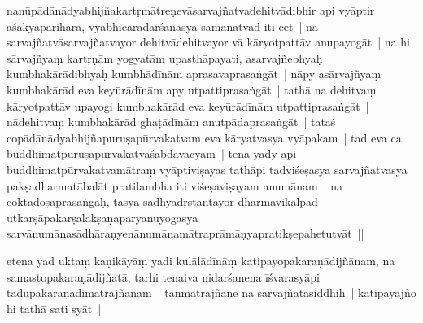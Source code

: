 \documentclass[article,12pt,a4paper]{memoir}
\begin{document}
	  \pstart {}\label{thakur75-34.17}nanūpādānādyabhijñakartṛmātreṇevāsarvajñatvadehitvādibhir api vyāptir aśakyaparihārā, vyabhicārādarśanasya samānatvād iti cet | na | sarvajñatvāsarvajñatvayor dehitvādehitvayor vā kāryotpattāv anupayogāt | na hi sārvajñyaṃ kartṛṇām yogyatām upasthāpayati, asarvajñebhyaḥ kumbhakārādibhyaḥ kumbhādīnām aprasavaprasaṅgāt | nāpy asārvajñyaṃ kumbhakārād eva keyūrādīnām apy utpattiprasaṅgāt | tathā na dehitvaṃ kāryotpattāv upayogi kumbhakārād eva keyūrādīnām utpattiprasaṅgāt | nādehitvaṃ kumbhakārād ghaṭādīnām anutpādaprasaṅgāt | tataś copādānādyabhijñapuruṣapūrvakatvam eva kāryatvasya vyāpakam | tad eva ca buddhimatpuruṣapūrvakatvaśabdavācyam | \label{sarit__ratnakīrtinibandhāvali__88081}tena yady api buddhimatpūrvakatvamātraṃ vyāptiviṣayas tathāpi tadviśeṣasya sarvajñatvasya pakṣadharmatābalāt pratilambha iti viśeṣaviṣayam anumānam | na coktadoṣaprasaṅgaḥ, tasya sādhyadṛṣṭāntayor dharmavikalpād utkarṣāpakarṣalakṣaṇaparyanuyogasya sarvānumānasādhāraṇyenānumānamātraprāmāṇyapratikṣepahetutvāt ||\label{sarit__ratnakīrtinibandhāvali__88447}
	\pend
      

	  \pstart etena yad uktaṃ kaṇikāyāṃ \label{nk-150.9}yadi kulālādīnāṃ katipayopakaraṇādijñānam, na samastopakaraṇādijñatā, tarhi tenaiva nidarśanena īśvarasyāpi \label{ratnakīrtinibandhāvali__36r1NLOHWTQ70VHBU3NJZWC5S9G}tadupakaraṇādimātrajñānam | tanmātrajñāne na sarvajñatāsiddhiḥ |\label{ratnakīrtinibandhāvali__36r1NLOHWTQZXFC6755VVL7IPZO} katipayajño hi tathā sati syāt |
	\pend
      
\end{document}
